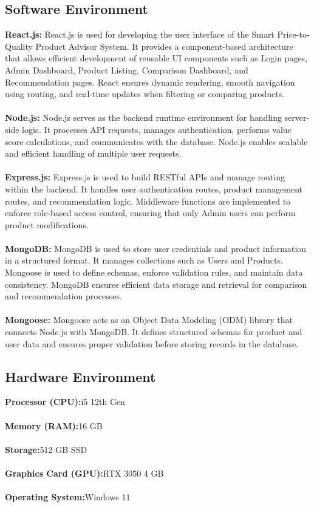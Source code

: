  \subsection{Software Environment}
 \textbf{React.js:}
 React.js is used for developing the user interface of the Smart Price-to-Quality Product Advisor System. It provides a component-based architecture that allows efficient development of reusable UI components such as Login pages, Admin Dashboard, Product Listing, Comparison Dashboard, and Recommendation pages. React ensures dynamic rendering, smooth navigation using routing, and real-time updates when filtering or comparing products.\\\\
 \textbf{Node.js:}
 Node.js serves as the backend runtime environment for handling server-side logic. It processes API requests, manages authentication, performs value score calculations, and communicates with the database. Node.js enables scalable and efficient handling of multiple user requests.
 \\\\
 \textbf{Express.js:}
Express.js is used to build RESTful APIs and manage routing within the backend. It handles user authentication routes, product management routes, and recommendation logic. Middleware functions are implemented to enforce role-based access control, ensuring that only Admin users can perform product modifications.
\\\\
 \textbf{MongoDB:}
 MongoDB is used to store user credentials and product information in a structured format. It manages collections such as Users and Products. Mongoose is used to define schemas, enforce validation rules, and maintain data consistency. MongoDB ensures efficient data storage and retrieval for comparison and recommendation processes.
\\\\

\textbf{Mongoose:}
Mongoose acts as an Object Data Modeling (ODM) library that connects Node.js with MongoDB. It defines structured schemas for product and user data and ensures proper validation before storing records in the database.
 
 
 \subsection{Hardware Environment}
 \textbf{Processor (CPU):}i5 12th Gen\\\\
 \textbf{Memory (RAM):}16 GB\\\\
 \textbf{Storage:}512 GB SSD\\\\
 \textbf{Graphics Card (GPU):}RTX 3050 4 GB\\\\
 \textbf{Operating System:}Windows 11
 \newpage
